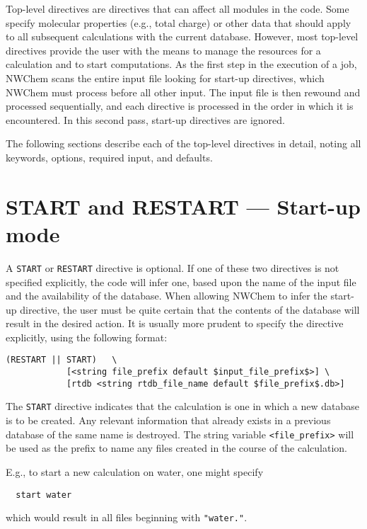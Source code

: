 \label{sec:toplevel}

Top-level directives are directives that can affect all modules in the
code.  Some specify molecular properties (e.g., total charge) or other
data that should apply to all subsequent calculations with the current
database.  However, most top-level directives provide the user with
the means to manage the resources for a calculation and to start
computations.  As the first step in the execution of a job, NWChem
scans the entire input file looking for start-up directives, which
NWChem must process before all other input.  The input file is then
rewound and processed sequentially, and each directive is processed in
the order in which it is encountered.  In this second pass, start-up
directives are ignored.

The following sections describe each of the top-level directives in
detail, noting all keywords, options, required input, and defaults.

\section{START and RESTART --- Start-up mode}
\label{sec:start}

A {\tt START} or {\tt RESTART} directive is
optional.  If one of these two directives is not specified
explicitly, the code will infer one, based upon the name of the
input file and the availability of the database.  When allowing NWChem
to infer the start-up directive, the user must be quite certain that
the contents of the database will result in the desired action.  It
is usually more prudent to specify the directive explicitly, using the
following format:

\begin{verbatim}
(RESTART || START)   \
            [<string file_prefix default $input_file_prefix$>] \
            [rtdb <string rtdb_file_name default $file_prefix$.db>]
\end{verbatim}

The \verb+START+ directive indicates that the calculation is one in
which a new database is to be created.  Any relevant information that
already exists in a previous database of the same name is destroyed.
The string variable {\tt <file\_prefix>} will be used as the prefix to
name any files created in the course of the calculation.  

E.g., to start a new calculation on water, one might specify
\begin{verbatim}
  start water
\end{verbatim}
which would result in all files beginning with {\tt "water."}.

